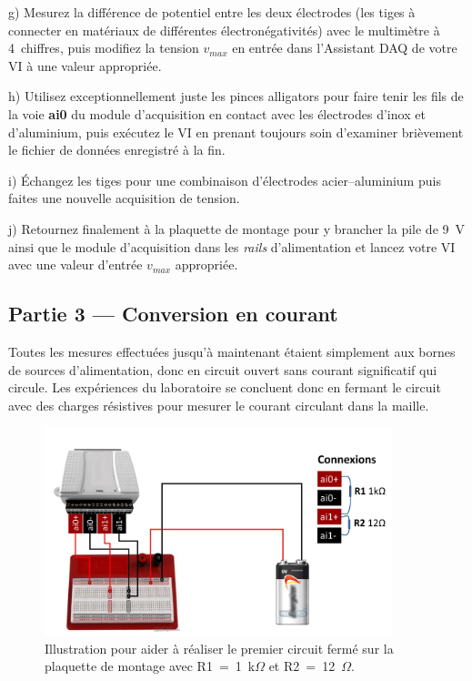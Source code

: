 \documentclass[canadien,12pt,oneside,letterpaper]{article}
\begin{document}
g) Mesurez la différence de potentiel entre les deux électrodes (les tiges à connecter en matériaux de différentes électronégativités) avec le multimètre à 4\textonehalf~chiffres, puis modifiez la tension $v_{max}$ en entrée dans l'Assistant DAQ de votre VI à une valeur appropriée.

h) Utilisez exceptionnellement juste les pinces alligators pour faire tenir les fils de la voie \textbf{ai0} du module d'acquisition en contact avec les électrodes d'inox et d'aluminium, puis exécutez le VI en prenant toujours soin d'examiner brièvement le fichier de données enregistré à la fin. 

i) Échangez les tiges pour une combinaison d'électrodes acier--aluminium puis faites une nouvelle acquisition de tension.

j) Retournez finalement à la plaquette de montage pour y brancher la pile de 9~V ainsi que le module d'acquisition dans les \textit{rails} d'alimentation et lancez votre VI avec une valeur d'entrée $v_{max}$ appropriée. 

\subsection{Partie 3 --- Conversion en courant}

Toutes les mesures effectuées jusqu'à maintenant étaient simplement aux bornes de sources d'alimentation, donc en circuit ouvert sans courant significatif qui circule. Les expériences du laboratoire se concluent donc en fermant le circuit avec des charges résistives pour mesurer le courant circulant dans la maille.

\begin{figure}[h]
\centering
\includegraphics[width=0.9\textwidth]{L01-sch-poweredbreadboard}
\caption{\label{L01-sch-poweredbreadboard} Illustration pour aider à réaliser le premier circuit fermé sur la plaquette de montage avec R1~=~1~k$\Omega$ et R2~=~12~$\Omega$.}
\end{figure}
\end{document}
